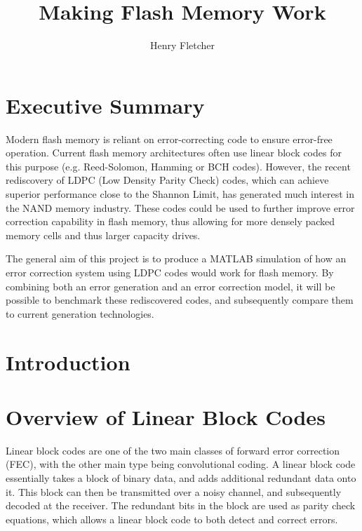 \documentclass[11pt]{article}
\author{Henry Fletcher}
\title{Making Flash Memory Work}
\begin{document}
\section{Executive Summary}

Modern flash memory is reliant on error-correcting code to ensure error-free operation. Current flash memory architectures often use linear block codes for this purpose (e.g. Reed-Solomon, Hamming or BCH codes). However, the recent rediscovery of LDPC (Low Density Parity Check) codes, which can achieve superior performance close to the Shannon Limit, has generated much interest in the NAND memory industry. These codes could be used to further improve error correction capability in flash memory, thus allowing for more densely packed memory cells and thus larger capacity drives.

The general aim of this project is to produce a MATLAB simulation of how an error correction system using LDPC codes would work for flash memory.  By combining both an error generation and an error correction model, it will be possible to benchmark these rediscovered codes, and subsequently compare them to current generation technologies.

\tableofcontents

\section{Introduction}

\section{Overview of Linear Block Codes}

Linear block codes are one of the two main classes of forward error correction (FEC), with the other main type being convolutional coding. A linear block code essentially takes a block of binary data, and adds additional redundant data onto it. This block can then be transmitted over a noisy channel, and subsequently decoded at the receiver. The redundant bits in the block are used as parity check equations, which allows a linear block code to both detect and correct errors. 
\end{document}
